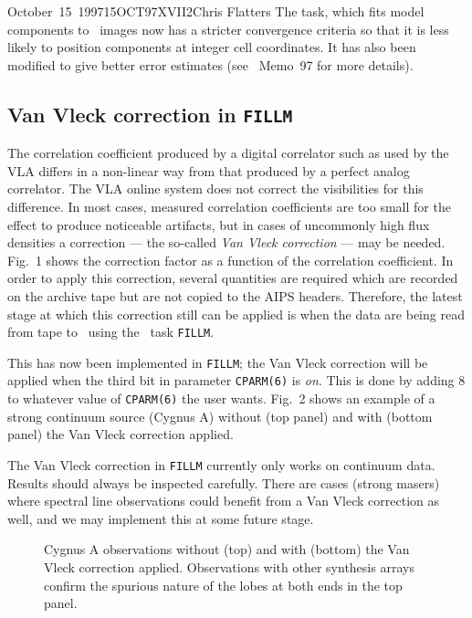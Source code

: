 \documentclass[twoside]{article}
\begin{document}
\begin{aipsletter}{October~15~1997}{15OCT97}{XVII}{2}{Chris Flatters}
The  task, which fits model components to \AIPS\ images
now has a stricter convergence criteria so that it is less likely to
position components at integer cell coordinates.  It has also been
modified to give better error estimates (see \AIPS\ Memo~97 for more
details).

\subsection{Van Vleck correction in {\tt FILLM}}

The correlation coefficient produced by a digital correlator such as
used by the VLA differs in a non-linear way from that produced by a
perfect analog correlator.  The VLA online system does not correct the
visibilities for this difference.  In most cases, measured correlation
coefficients are too small for the effect to produce noticeable
artifacts, but in cases of uncommonly high flux densities a correction
--- the so-called \emph{Van Vleck correction} --- may be needed.
Fig.~1 shows the correction factor as a function of the correlation
coefficient.  In order to apply this correction, several quantities
are required which are recorded on the archive tape but are not copied
to the AIPS headers.  Therefore, the latest stage at which this
correction still can be applied is when the data are being read from
tape to \AIPS\ using the \AIPS\ task {\tt FILLM}.

This has now been implemented in {\tt FILLM}; the Van Vleck correction
will be applied when the third bit in parameter {\tt CPARM(6)} is {\it
on}.  This is done by adding 8 to whatever value of {\tt CPARM(6)} the
user wants.  Fig.~2 shows an example of a strong continuum source
(Cygnus A) without (top panel) and with (bottom panel) the Van Vleck
correction applied.

The Van Vleck correction in {\tt FILLM} currently only works on
continuum data.  Results should always be inspected carefully. There
are cases (strong masers) where spectral line observations could
benefit from a Van Vleck correction as well, and we may implement this
at some future stage.

\begin{figure}
\begin{minipage}[b]{0.46\linewidth}
\caption{The Van Vleck correction factor applied to
the visibilities as a function of the correlation coefficient.  This
graph refers to the actual Cygnus A data shown in Fig.~2.  Note the
unusually high correlation coefficients present in these data.}
\end{minipage}\hfill
\begin{minipage}[b]{0.46\linewidth}
\centerline{}
\caption{Cygnus A observations without (top) and with
(bottom) the Van Vleck correction applied.  Observations with other
synthesis arrays confirm the spurious nature of the lobes at both ends
in the top panel.}
\end{minipage}
\end{figure}


\end{aipsletter}
\end{document}
